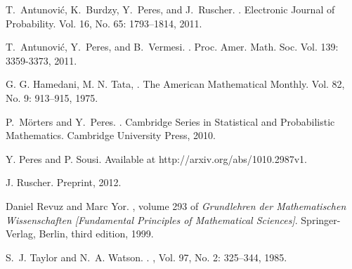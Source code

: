 \documentclass[11pt,reqno]{amsart}
\theoremstyle{plain}
\theoremstyle{definition}
\theoremstyle{remark}
\begin{document}
\begin{thebibliography}{4}

T.~Antunovi\'{c}, K.~Burdzy, Y.~Peres, and J.~Ruscher.
.
\newblock Electronic Journal of Probability. Vol. 16, No. 65: 1793--1814, 2011.

T.~Antunovi\'{c}, Y.~Peres, and B.~Vermesi.
.
\newblock Proc. Amer. Math. Soc. Vol. 139: 3359-3373, 2011.

G. G. Hamedani, M. N. Tata,
.
\newblock The American Mathematical Monthly. Vol. 82, No. 9: 913--915, 1975.

P.~M\"{o}rters and Y.~Peres.
.
\newblock Cambridge Series in Statistical and Probabilistic Mathematics.
  Cambridge University Press, 2010.

Y. Peres and P. Sousi.
\newblock Available at http://arxiv.org/abs/1010.2987v1.

J. Ruscher.
\newblock Preprint, 2012.

Daniel Revuz and Marc Yor.
, volume 293 of
  {\em Grundlehren der Mathematischen Wissenschaften [Fundamental Principles of
  Mathematical Sciences]}.
\newblock Springer-Verlag, Berlin, third edition, 1999.

S.~J. Taylor and N.~A. Watson.
.
, Vol. 97, No. 2: 325--344, 1985.

\end{thebibliography}
\end{document}

